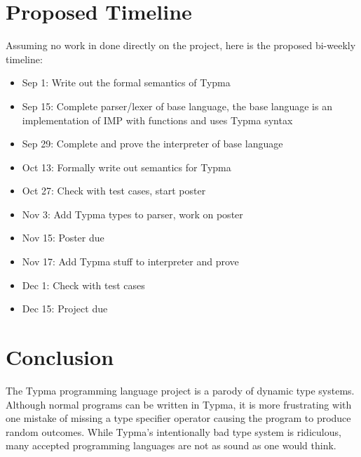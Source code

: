 \documentclass[10pt,twocolumn]{article}
\begin{document}
\section{Proposed Timeline}
Assuming no work in done directly on the project, here is the proposed bi-weekly timeline:

\begin{itemize}

\item Sep 1: Write out the formal semantics of Typma

\item Sep 15: Complete parser/lexer of base language, the base language is an implementation of IMP with functions and uses Typma syntax

\item Sep 29: Complete and prove the interpreter of base language

\item Oct 13: Formally write out semantics for Typma

\item Oct 27: Check with test cases, start poster

\item Nov 3: Add Typma types to parser, work on poster

\item Nov 15: Poster due

\item Nov 17: Add Typma stuff to interpreter and prove

\item Dec 1: Check with test cases

\item Dec 15: Project due

\end{itemize}

\section{Conclusion}

The Typma programming language project is a parody of dynamic type systems. Although normal programs can be written in Typma, it is more frustrating with one mistake of missing a type specifier operator causing the program to produce random outcomes. While Typma's intentionally bad type system is ridiculous, many accepted programming languages are not as sound as one would think.

\printbibliography 
\end{document}

